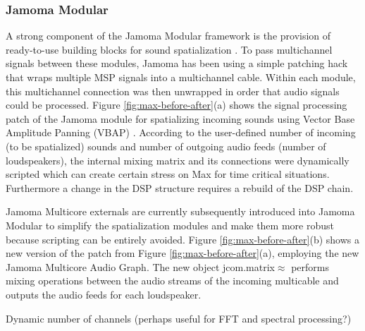 \documentclass[twoside,a4paper]{article}
\begin{document}
\subsubsection{Jamoma Modular} %
A strong component of the Jamoma Modular framework is the provision of ready-to-use building blocks for sound spatialization \cite{Peters:2009}.
To pass multichannel signals between these modules, Jamoma has been using a simple patching hack that wraps multiple MSP signals into a multichannel cable. Within each module, this multichannel connection was then unwrapped in order that audio signals could be processed. 
Figure \ref{fig:max-before-after}(a) shows the signal processing patch of the Jamoma module for spatializing incoming sounds using Vector Base Amplitude Panning (VBAP) \cite{Pulkki:1997vbap}. 
According to the user-defined number of incoming (to be spatialized) sounds and number of outgoing audio feeds (number of loudspeakers), the internal mixing matrix and its connections were dynamically scripted which can create certain stress on Max for time critical situations.   
Furthermore a change in the DSP structure requires a rebuild of the DSP chain.   

Jamoma Multicore externals are currently subsequently introduced into Jamoma Modular to simplify the spatialization modules and make them more robust because scripting can be entirely avoided. 
Figure \ref{fig:max-before-after}(b) shows a new version of the patch from Figure \ref{fig:max-before-after}(a), employing the new Jamoma Multicore Audio Graph. 
The new object jcom.matrix$\approx$ performs mixing operations between the audio streams of the incoming multicable and outputs the audio feeds for each loudspeaker. 

\vspace{1cm}
       




Dynamic number of channels (perhaps useful for FFT and spectral processing?)
\end{document}
